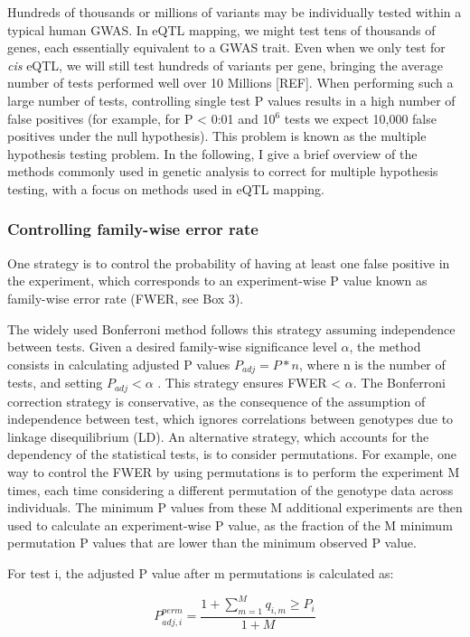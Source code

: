 Hundreds of thousands or millions of variants may be individually tested within a typical human GWAS. 
In eQTL mapping, we might test tens of thousands of genes, each essentially equivalent to a GWAS trait. 
Even when we only test for \textit{cis} eQTL, we will still test hundreds of variants per gene, bringing the average number of tests performed well over 10 Millions [REF].  
When performing such a large number of tests, controlling single test P values results in a high number of false positives (for example, for P < 0:01 and 10$^6$ tests we expect 10,000 false positives under the null hypothesis). 
This problem is known as the multiple hypothesis testing problem. 
In the following, I give a brief overview of the methods commonly used in genetic analysis to correct for multiple hypothesis testing, with a focus on methods used in eQTL mapping.

\subsubsection{Controlling family-wise error rate} 

One strategy is to control the probability of having at least one false positive in the experiment, which corresponds to an experiment-wise P value known as family-wise error rate (FWER, see Box 3).

The widely used Bonferroni method follows this strategy assuming independence between tests. 
Given a desired family-wise significance level $\alpha$, the method consists in calculating adjusted P values $P_{adj} = P*n $, where n is the number of tests, and setting $P_{adj} < \alpha$ . 
This strategy ensures FWER < $\alpha$. 
The Bonferroni correction strategy is conservative, as the consequence of the assumption of independence between test, which ignores correlations between genotypes due to linkage disequilibrium (LD). 
An alternative strategy, which accounts for the dependency of the statistical tests, is to consider permutations. 
For example, one way to control the FWER by using permutations is to perform the experiment M times, each time considering a different permutation of the genotype data across individuals.
The minimum P values from these M additional experiments are then used to calculate an experiment-wise P value, as the fraction of the M minimum permutation P values that are lower than the minimum observed P value. 

For test i, the adjusted P value after m permutations is calculated as:

\begin{equation}\label{eq19:permutation_adjusted_pvalue}
    P_{adj,i}^{perm} = \frac{1+\sum_{m=1}^{M} q_{i,m} \geq P_i}{1+M}
\end{equation}


